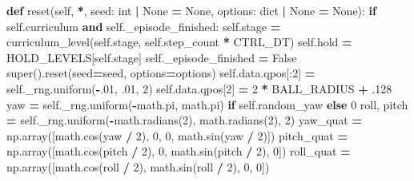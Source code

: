 \documentclass[
  chinese,
  11pt,
  letterpaper,
]{article}
\newenvironment{Shaded}{\begin{snugshade}}{\end{snugshade}}
\newcommand{\BuiltInTok}[1]{#1}
\newcommand{\ControlFlowTok}[1]{\textcolor[rgb]{0.13,0.29,0.53}{\textbf{#1}}}
\newcommand{\DecValTok}[1]{\textcolor[rgb]{0.00,0.00,0.81}{#1}}
\newcommand{\FloatTok}[1]{\textcolor[rgb]{0.00,0.00,0.81}{#1}}
\newcommand{\KeywordTok}[1]{\textcolor[rgb]{0.13,0.29,0.53}{\textbf{#1}}}
\newcommand{\NormalTok}[1]{#1}
\newcommand{\OperatorTok}[1]{\textcolor[rgb]{0.81,0.36,0.00}{\textbf{#1}}}
\newcommand{\VariableTok}[1]{\textcolor[rgb]{0.00,0.00,0.00}{#1}}
\renewenvironment{Shaded}{\par\smallskip}{\par\smallskip}
\begin{document}
\begin{Shaded}
\begin{Highlighting}[]
    \KeywordTok{def}\NormalTok{ reset(}\VariableTok{self}\NormalTok{, }\OperatorTok{*}\NormalTok{, seed: }\BuiltInTok{int} \OperatorTok{|} \VariableTok{None} \OperatorTok{=} \VariableTok{None}\NormalTok{, options: }\BuiltInTok{dict} \OperatorTok{|} \VariableTok{None} \OperatorTok{=} \VariableTok{None}\NormalTok{):}
        \ControlFlowTok{if} \VariableTok{self}\NormalTok{.curriculum }\KeywordTok{and} \VariableTok{self}\NormalTok{.\_episode\_finished:}
            \VariableTok{self}\NormalTok{.stage }\OperatorTok{=}\NormalTok{ curriculum\_level(}\VariableTok{self}\NormalTok{.stage, }\VariableTok{self}\NormalTok{.step\_count }\OperatorTok{*}\NormalTok{ CTRL\_DT)}
            \VariableTok{self}\NormalTok{.hold }\OperatorTok{=}\NormalTok{ HOLD\_LEVELS[}\VariableTok{self}\NormalTok{.stage]}
        \VariableTok{self}\NormalTok{.\_episode\_finished }\OperatorTok{=} \VariableTok{False}
        \BuiltInTok{super}\NormalTok{().reset(seed}\OperatorTok{=}\NormalTok{seed, options}\OperatorTok{=}\NormalTok{options)}
        \VariableTok{self}\NormalTok{.data.qpos[:}\DecValTok{2}\NormalTok{] }\OperatorTok{=} \VariableTok{self}\NormalTok{.\_rng.uniform(}\OperatorTok{{-}}\FloatTok{.01}\NormalTok{, }\FloatTok{.01}\NormalTok{, }\DecValTok{2}\NormalTok{)}
        \VariableTok{self}\NormalTok{.data.qpos[}\DecValTok{2}\NormalTok{] }\OperatorTok{=} \DecValTok{2} \OperatorTok{*}\NormalTok{ BALL\_RADIUS }\OperatorTok{+} \FloatTok{.128}
\NormalTok{        yaw }\OperatorTok{=} \VariableTok{self}\NormalTok{.\_rng.uniform(}\OperatorTok{{-}}\NormalTok{math.pi, math.pi) }\ControlFlowTok{if} \VariableTok{self}\NormalTok{.random\_yaw }\ControlFlowTok{else} \DecValTok{0}
\NormalTok{        roll, pitch }\OperatorTok{=} \VariableTok{self}\NormalTok{.\_rng.uniform(}\OperatorTok{{-}}\NormalTok{math.radians(}\DecValTok{2}\NormalTok{), math.radians(}\DecValTok{2}\NormalTok{), }\DecValTok{2}\NormalTok{)}
\NormalTok{        yaw\_quat }\OperatorTok{=}\NormalTok{ np.array([math.cos(yaw }\OperatorTok{/} \DecValTok{2}\NormalTok{), }\DecValTok{0}\NormalTok{, }\DecValTok{0}\NormalTok{, math.sin(yaw }\OperatorTok{/} \DecValTok{2}\NormalTok{)])}
\NormalTok{        pitch\_quat }\OperatorTok{=}\NormalTok{ np.array([math.cos(pitch }\OperatorTok{/} \DecValTok{2}\NormalTok{), }\DecValTok{0}\NormalTok{, math.sin(pitch }\OperatorTok{/} \DecValTok{2}\NormalTok{), }\DecValTok{0}\NormalTok{])}
\NormalTok{        roll\_quat }\OperatorTok{=}\NormalTok{ np.array([math.cos(roll }\OperatorTok{/} \DecValTok{2}\NormalTok{), math.sin(roll }\OperatorTok{/} \DecValTok{2}\NormalTok{), }\DecValTok{0}\NormalTok{, }\DecValTok{0}\NormalTok{])}

\end{Highlighting}
\end{Shaded}
\end{document}
